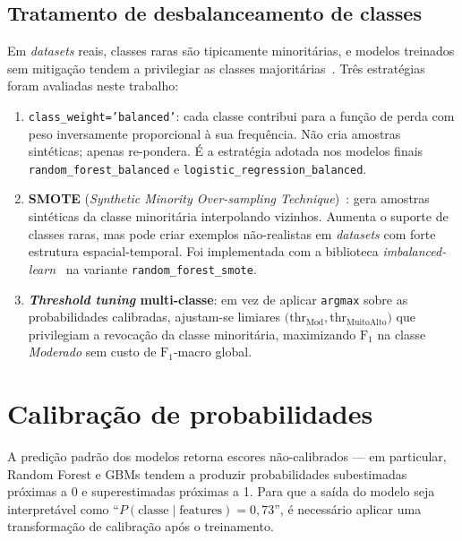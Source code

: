 \subsection{Tratamento de desbalanceamento de classes}
\label{sec:fund_desbalanceamento}

Em \emph{datasets} reais, classes raras são tipicamente minoritárias, e modelos treinados sem mitigação tendem a privilegiar as classes majoritárias~\cite{he2009learning}. Três estratégias foram avaliadas neste trabalho:

\begin{enumerate}
  \item \texttt{class\_weight='balanced'}: cada classe contribui para a função de perda com peso inversamente proporcional à sua frequência. Não cria amostras sintéticas; apenas re-pondera. É a estratégia adotada nos modelos finais \texttt{random\_forest\_balanced} e \texttt{logistic\_regression\_balanced}.

  \item \textbf{SMOTE} (\emph{Synthetic Minority Over-sampling Technique})~\cite{chawla2002smote}: gera amostras sintéticas da classe minoritária interpolando vizinhos. Aumenta o suporte de classes raras, mas pode criar exemplos não-realistas em \emph{datasets} com forte estrutura espacial-temporal. Foi implementada com a biblioteca \emph{imbalanced-learn}~\cite{lemaitre2017imbalanced} na variante \texttt{random\_forest\_smote}.

  \item \textbf{\emph{Threshold tuning} multi-classe}: em vez de aplicar \texttt{argmax} sobre as probabilidades calibradas, ajustam-se limiares \(\bigl(\text{thr}_{\text{Mod}}, \text{thr}_{\text{MuitoAlto}}\bigr)\) que privilegiam a revocação da classe minoritária, maximizando \(\text{F}_1\) na classe \emph{Moderado} sem custo de \(\text{F}_1\)-macro global.
\end{enumerate}


\section{Calibração de probabilidades}
\label{sec:fund_calibracao}

A predição padrão dos modelos retorna escores não-calibrados --- em particular, Random Forest e GBMs tendem a produzir probabilidades subestimadas próximas a 0 e superestimadas próximas a 1. Para que a saída do modelo seja interpretável como ``\(P(\text{classe} \mid \text{features}) = 0{,}73\)'', é necessário aplicar uma transformação de calibração após o treinamento.

